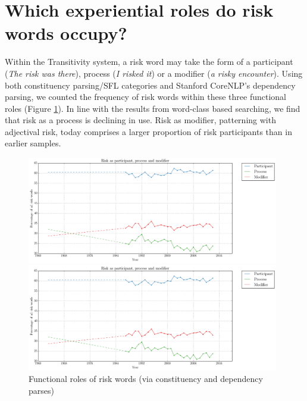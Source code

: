	\section{Which experiential roles do risk words occupy?} 
	\FloatBarrier

	Within the Transitivity system, a risk word may take the form of a participant (\emph{The risk was there}), process (\emph{I risked it}) or a modifier (\emph{a risky encounter}). Using both constituency parsing\slash SFL categories and Stanford CoreNLP's dependency parsing, we counted the frequency of risk words within these three functional roles (Figure \ref{fig:funcrole}). In line with the results from word-class based searching, we find that risk as a process is declining in use. Risk as modifier, patterning with adjectival risk, today comprises a larger proportion of risk participants than in earlier samples.

		  \noindent
          \begin{figure}[htb!]
          \centering
          \begin{minipage}{.48\textwidth}
			\centering
			\includegraphics[width=0.98\textwidth]{../images/risk_as_participant,_process_and_modifier.png}
          \end{minipage}%
          \begin{minipage}{.48\textwidth}
            \centering
            \includegraphics[width=0.98\textwidth]{../images/risk_as_participant,_process_and_modifier.png}
           \end{minipage}
           \caption{Functional roles of risk words (via constituency and dependency parses)}
                \label{fig:funcrole}
          \end{figure}


